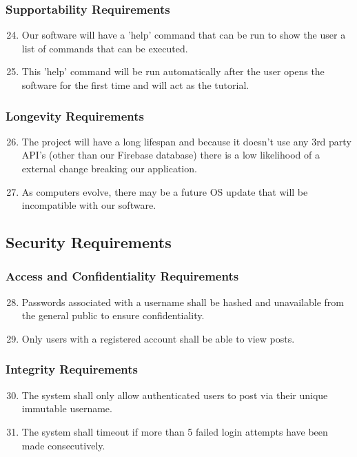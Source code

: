 \documentclass[12pt, titlepage]{article}
\begin{document}
\subsubsection{Supportability Requirements}
    \begin{enumerate}
    \setcounter{enumi}{23}
        \item Our software will have a 'help' command that can be run to show the user a list of commands that can be executed.
        \item This 'help' command will be run automatically after the user opens the software for the first time and will act as the tutorial.
    \end{enumerate}
\subsubsection{Longevity Requirements}
    \begin{enumerate}
    \setcounter{enumi}{25}
        \item The project will have a long lifespan and because it doesn't use any 3rd party API's (other than our Firebase database) there is a low likelihood of a external change breaking our application.
        \item As computers evolve, there may be a future OS update that will be incompatible with our software.
    \end{enumerate}
\subsection{Security Requirements}
\subsubsection{Access and Confidentiality Requirements}
    \begin{enumerate}
    \setcounter{enumi}{27}
        \item Passwords associated with a username shall be hashed and unavailable from the general public to ensure confidentiality.
        \item Only users with a registered account shall be able to view posts.
    \end{enumerate}
\subsubsection{Integrity Requirements}
    \begin{enumerate}
    \setcounter{enumi}{29}
    \item The system shall only allow authenticated users to post via their unique immutable username.
        \item The system shall timeout if more than 5 failed login attempts have been made consecutively.
    \end{enumerate}
\end{document}
